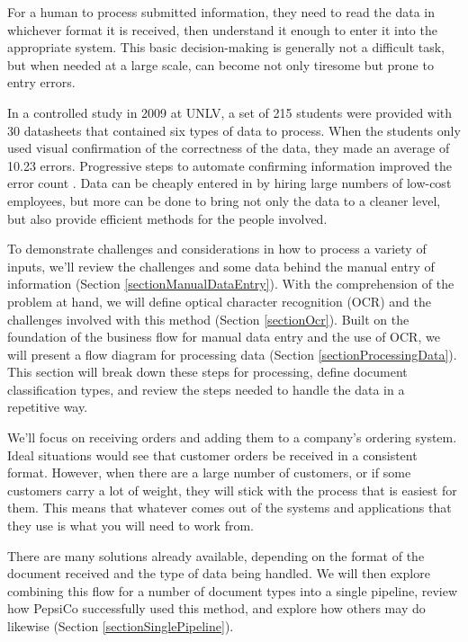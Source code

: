 \documentclass[conference]{IEEEtran}
\begin{document}
For a human to process submitted information, they need to read the data in whichever format it is received, then understand it enough to enter it into the appropriate system. This basic decision-making is generally not a difficult task, but when needed at a large scale, can become not only tiresome but prone to entry errors. 

In a controlled study in 2009 at UNLV, a set of 215 students were provided with 30 datasheets that contained six types of data to process. When the students only used visual confirmation of the correctness of the data, they made an average of 10.23 errors. Progressive steps to automate confirming information improved the error count \cite{harris2014when}. Data can be cheaply entered in by hiring large numbers of low-cost employees, but more can be done to bring not only the data to a cleaner level, but also provide efficient methods for the people involved.

To demonstrate challenges and considerations in how to process a variety of inputs, we'll review the challenges and some data behind the manual entry of information (Section \ref{sectionManualDataEntry}). With the comprehension of the problem at hand, we will define optical character recognition (OCR) and the challenges involved with this method (Section \ref{sectionOcr}). Built on the foundation of the business flow for manual data entry and the use of OCR, we will present a flow diagram for processing data (Section \ref{sectionProcessingData}). This section will break down these steps for processing, define document classification types, and review the steps needed to handle the data in a repetitive way.

We'll focus on receiving orders and adding them to a company's ordering system. Ideal situations would see that customer orders be received in a consistent format. However, when there are a large number of customers, or if some customers carry a lot of weight, they will stick with the process that is easiest for them. This means that whatever comes out of the systems and applications that they use is what you will need to work from.

There are many solutions already available, depending on the format of the document received and the type of data being handled. We will then explore combining this flow for a number of document types into a single pipeline, review how PepsiCo successfully used this method, and explore how others may do likewise (Section \ref{sectionSinglePipeline}).
\end{document}
